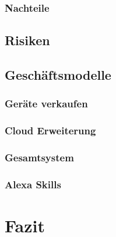 \subsubsection{Nachteile}

\subsection{Risiken}


\subsection{Geschäftsmodelle}


\subsubsection{Geräte verkaufen} %


\subsubsection{Cloud Erweiterung} %


\subsubsection{Gesamtsystem} %


\subsubsection{Alexa Skills} %



\section{Fazit}

